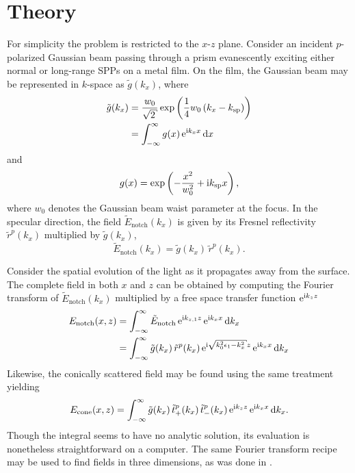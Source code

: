 \section{Theory}\label{sec:interferencetheory}
For simplicity the problem is restricted to the $x$-$z$ plane.  Consider an
incident $p$-polarized Gaussian beam passing through a prism evanescently
exciting either normal or long-range SPPs on a metal film.  On the film,
the Gaussian beam may be represented in $k$-space as $\tilde{g}(k_x)$,
where
\begin{align}
\tilde{g}(k_x) &= \frac{w_0}{\sqrt{2}} \exp\left(\frac{1}{4}w_0\left(k_x - \ksp\right)\right)\\
&= \intinfty g(x)\, \me^{\mi k_x x} \md x
\end{align}
and
\begin{equation}
g(x) = \exp\left(-\frac{x^2}{w_0^2} + {\mathrm{i}} k_\mathrm{sp} x\right),
\end{equation}
where $w_0$ denotes the Gaussian beam waist parameter at the focus.  In the
specular direction, the field $\tilde{E}_\mathrm{notch}(k_x)$ is given by its
Fresnel reflectivity $\tilde{r}^p(k_x)$ multiplied by $\tilde{g}(k_x)$,
\begin{equation}
\tilde{E}_\mathrm{notch}(k_x)=\tilde{g}(k_x)\,\tilde{r}^p(k_x).
\end{equation}

Consider the spatial evolution of the light as it propagates
away from the surface.
The complete field in both $x$ and $z$ can be obtained by computing
the Fourier transform of $\tilde{E}_\mathrm{notch}(k_x)$ multiplied 
by a free space transfer function ${\mathrm{e}}^{{\mathrm{i}} k_{z} z}$
\begin{align}
E_\mathrm{notch}(x,z) &= \intinfty \tilde{E}_\mathrm{notch}\, \me^{\mi k_{z,1} z}\, \me^{\mi k_x x} \md k_x\\
 &= \intinfty \tilde{g}(k_x)\, \tilde{r}^p(k_x)\, \me^{\mi \sqrt{k_0^2 \epsilon_1 - k_x^2}z}\, \me^{\mi k_x x} \md k_x
\label{eqn:fourier123}
\end{align}
Likewise, the conically scattered field may be found using the same
treatment yielding
\begin{align}
E_\text{cone}(x,z) = \int_{-\infty}^{\infty} \tilde{g}(k_x)\, 
\tilde{t}^p_+(k_x)\, \tilde{t}^p_-(k_x)\,{\mathrm{e}}^{{\mathrm{i}} k_z z}\, {\mathrm{e}}^{{\mathrm{i}} k_x x}
\,\mathrm{d} k_x.
\label{eqn:fourier321}
\end{align}
Though the integral seems to have no analytic solution, its evaluation is
nonetheless straightforward on a computer.  The same Fourier transform
recipe may be used to find fields in three dimensions, as was done in
.

